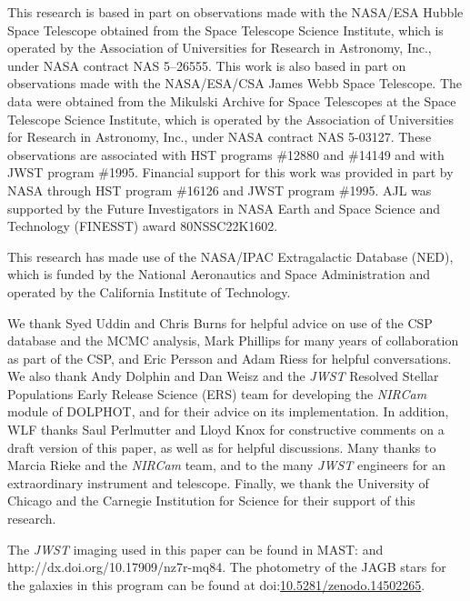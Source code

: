 \documentclass[12pt,modern]{aastex631}
\newcommand{\jwst}{\emph{JWST}\xspace}
\newcommand{\nircam}{\emph{NIRCam}\xspace}
\begin{document}
\begin{acknowledgments}
This research is based in part on observations made with the NASA/ESA Hubble Space Telescope obtained from the Space Telescope Science Institute, which is operated by the Association of Universities for Research in Astronomy, Inc., under NASA contract NAS 5–26555. 
This work is also based in part on observations made with the NASA/ESA/CSA James Webb Space Telescope. 
The data were obtained from the Mikulski Archive for Space Telescopes at the Space Telescope Science Institute, which is operated by the Association of Universities for Research in Astronomy, Inc., under NASA contract NAS 5-03127.
These observations are associated with HST programs \#12880 and \#14149 and with JWST program \#1995.
Financial support for this work was provided in part by NASA through HST program \#16126 and JWST program \#1995.  AJL was supported by the Future Investigators in NASA Earth and Space Science and Technology (FINESST) award 80NSSC22K1602. 

This research has made use of the NASA/IPAC Extragalactic Database (NED), which is funded by the National Aeronautics and Space Administration and operated by the California Institute of Technology.

We thank Syed Uddin and Chris Burns for helpful advice on use of the CSP database and the MCMC analysis,  Mark Phillips for many years of collaboration as part of the CSP, and Eric Persson and Adam Riess for helpful conversations. We also thank Andy Dolphin and Dan Weisz and the \jwst Resolved Stellar Populations Early Release Science (ERS) team for developing the \nircam module of DOLPHOT, and for their advice on its implementation. In addition, WLF thanks Saul Perlmutter and Lloyd Knox for constructive comments on a draft version of this paper, as well as for helpful discussions. Many thanks to Marcia Rieke and the \nircam team, and to the many \jwst engineers for an extraordinary instrument and telescope.  Finally, we thank the University of Chicago and the Carnegie Institution for Science for their support of this research. 

The {\it JWST} imaging used in this paper can be found in MAST:  and  http://dx.doi.org/10.17909/nz7r-mq84. The photometry of the JAGB stars for the galaxies in this program can be found at doi:\href{https://zenodo.org/records/14502265}{10.5281/zenodo.14502265}.


\end{acknowledgments}
\end{document}

